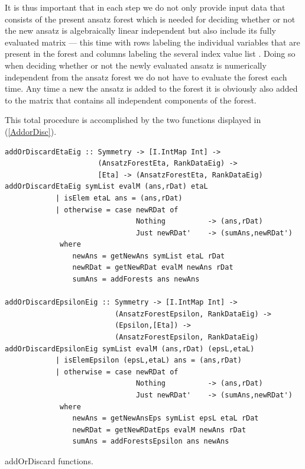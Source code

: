 \documentclass[a4paper,12pt, DIV=14, BCOR=5mm, twoside, headsepline, numbers=noenddot]{scrbook}
\begin{document}
It is thus important that in each step we do not only provide input data that consists of the present ansatz forest which is needed for deciding whether or not the new ansatz is algebraically linear independent but also include its fully evaluated matrix --- this time with rows labeling the individual variables that are present in the forest and columns labeling the several index value list
%
%
. Doing so when deciding whether or not the newly evaluated ansatz is numerically independent from the ansatz forest we do not have to evaluate the forest each time. Any time a  new the ansatz is added to the forest it is obviously also added to the matrix that contains all independent components of the forest.

This total procedure is accomplished by the two functions displayed in (\ref{AddorDisc}).

\begin{listing}[hbt!]
\begin{verbatim}
addOrDiscardEtaEig :: Symmetry -> [I.IntMap Int] ->
                      (AnsatzForestEta, RankDataEig) -> 
                      [Eta] -> (AnsatzForestEta, RankDataEig)
addOrDiscardEtaEig symList evalM (ans,rDat) etaL
            | isElem etaL ans = (ans,rDat)
            | otherwise = case newRDat of
                               Nothing          -> (ans,rDat)
                               Just newRDat'    -> (sumAns,newRDat')
             where
                newAns = getNewAns symList etaL rDat
                newRDat = getNewRDat evalM newAns rDat
                sumAns = addForests ans newAns

addOrDiscardEpsilonEig :: Symmetry -> [I.IntMap Int] ->
                          (AnsatzForestEpsilon, RankDataEig) ->
                          (Epsilon,[Eta]) ->
                          (AnsatzForestEpsilon, RankDataEig)
addOrDiscardEpsilonEig symList evalM (ans,rDat) (epsL,etaL)
            | isElemEpsilon (epsL,etaL) ans = (ans,rDat)
            | otherwise = case newRDat of
                               Nothing          -> (ans,rDat)
                               Just newRDat'    -> (sumAns,newRDat')
             where
                newAns = getNewAnsEps symList epsL etaL rDat
                newRDat = getNewRDatEps evalM newAns rDat
                sumAns = addForestsEpsilon ans newAns
\end{verbatim} 
\caption{addOrDiscard functions.}\label{AddorDisc}
\end{listing}
\end{document}
